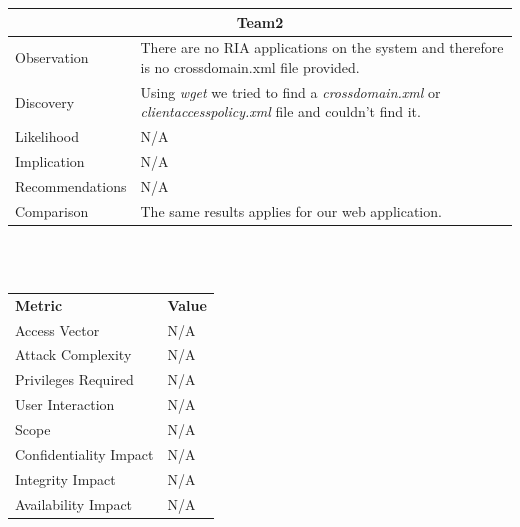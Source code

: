 \documentclass[headsepline,footsepline,footinclude=false,oneside,fontsize=11pt,paper=a4,listof=totoc,bibliography=totoc]{scrbook} %
\begin{document}
\begin{tabular}{ l|p{11cm}  }
	\hline
	\multicolumn{2}{c}{\textbf{Team2}} \\
	\hline
	Observation   & There are no RIA applications on the system and therefore is no crossdomain.xml file provided. \\
	Discovery  & Using \textit{wget} we tried to find a \textit{crossdomain.xml} or \textit{clientaccesspolicy.xml} file and couldn't find it. \\
	Likelihood & N/A \\
	Implication    & N/A \\
	Recommendations & N/A \\
	Comparison & The same results applies for our web application. \\
	\hline
\end{tabular}
\\
\vspace{0.5cm}
\\
\begin{center}
	\begin{tabular}{ll}
		\rowcolor[HTML]{34CDF9}
		{\color[HTML]{ECF4FF} \textbf{Metric}}        & {\color[HTML]{ECF4FF} \textbf{Value}} \\
		\rowcolor[HTML]{BBDAFF}
		{\color[HTML]{333333} Access Vector}          & {\color[HTML]{333333} } N/A              \\
		\rowcolor[HTML]{ECF4FF}
		{\color[HTML]{333333} Attack Complexity}      & {\color[HTML]{333333} } N/A              \\
		\rowcolor[HTML]{BBDAFF}
		{\color[HTML]{333333} Privileges Required}    & {\color[HTML]{333333} } N/A              \\
		\rowcolor[HTML]{ECF4FF}
		{\color[HTML]{333333} User Interaction}       & {\color[HTML]{333333} } N/A              \\
		\rowcolor[HTML]{BBDAFF}
		{\color[HTML]{333333} Scope}                  & {\color[HTML]{333333} } N/A              \\
		\rowcolor[HTML]{ECF4FF}
		{\color[HTML]{333333} Confidentiality Impact} & {\color[HTML]{333333} } N/A              \\
		\rowcolor[HTML]{BBDAFF}
		{\color[HTML]{333333} Integrity Impact}       & {\color[HTML]{333333} } N/A              \\
		\rowcolor[HTML]{ECF4FF}
		{\color[HTML]{333333} Availability Impact}    & {\color[HTML]{333333} } N/A
	\end{tabular}
\end{center}
\pagebreak
\end{document}
